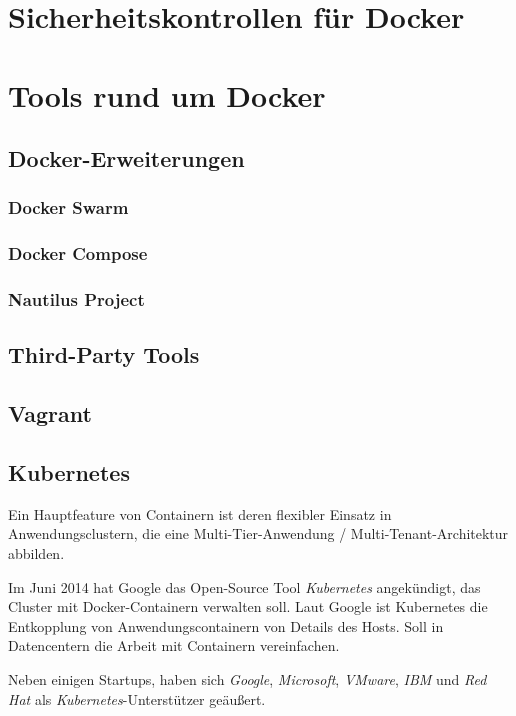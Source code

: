 \documentclass[../main.tex]{subfiles}
\begin{document}
  \section{Sicherheitskontrollen für Docker}
	\section{Tools rund um Docker}

    \subsection{Docker-Erweiterungen}
      \subsubsection{Docker Swarm}
      \subsubsection{Docker Compose}
      \subsubsection{Nautilus Project}
    \subsection{Third-Party Tools}
  		\subsection{Vagrant}
  		\subsection{Kubernetes}

        Ein Hauptfeature von Containern ist deren flexibler Einsatz in Anwendungsclustern, die eine Multi-Tier-Anwendung / Multi-Tenant-Architektur abbilden.

        Im Juni 2014 hat Google das Open-Source Tool \emph{Kubernetes} angekündigt, das Cluster mit Docker-Containern verwalten soll. Laut Google ist Kubernetes die Entkopplung von Anwendungscontainern von Details des Hosts.
        Soll in Datencentern die Arbeit mit Containern vereinfachen.

        Neben einigen Startups, haben sich \emph{Google}, \emph{Microsoft}, \emph{VMware}, \emph{IBM} und \emph{Red Hat} als \emph{Kubernetes}-Unterstützer geäußert.
\end{document}

